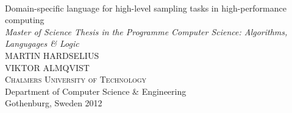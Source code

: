 \begin{titlepage}

\mbox{}
\vfill
\addtolength{\voffset}{2cm}
\begin{flushleft}
  {\\[0.2cm]
    {\huge Domain-specific language for high-level sampling
      tasks in high-performance computing}\\[.5cm]
    \emph{\Large Master of Science Thesis in the Programme Computer
      Science: Algorithms, Langugages \& Logic}\\[.8cm]
      
	
    {\huge MARTIN HARDSELIUS}\\[.8cm]
    {\huge VIKTOR ALMQVIST}\\[.8cm]
	
    {\textsc{Chalmers University of Technology}\\
      \Large Department of Computer Science \& Engineering \\
	Gothenburg, Sweden 2012 \\
    } 
  }
\end{flushleft}

\end{titlepage}
\ClearShipoutPicture
